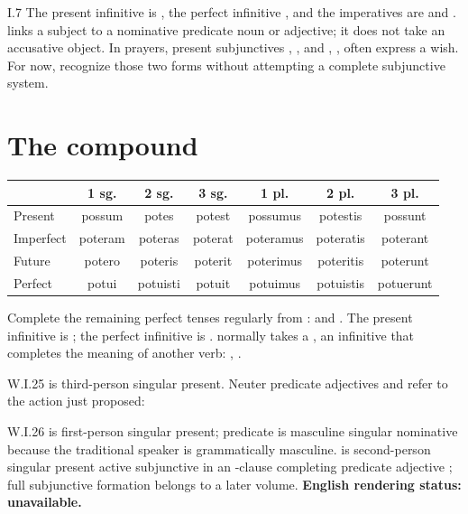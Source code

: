 \begin{courseunit}{I.7}
The present infinitive is , the perfect infinitive
, and the imperatives are  and .
 links a subject to a nominative predicate noun or adjective; it
does not take an accusative object. In prayers, present subjunctives
, , and , ,
often express a wish. For now, recognize those two forms without attempting a
complete subjunctive system.

\section{The compound }

\begin{center}\small
\begin{tabular}{@{}lcccccc@{}}
\toprule
& 1 sg. & 2 sg. & 3 sg. & 1 pl. & 2 pl. & 3 pl. \\
\midrule
Present & possum & potes & potest & possumus & potestis & possunt \\
Imperfect & poteram & poteras & poterat & poteramus & poteratis & poterant \\
Future & potero & poteris & poterit & poterimus & poteritis & poterunt \\
Perfect & potui & potuisti & potuit & potuimus & potuistis & potuerunt \\
\bottomrule
\end{tabular}
\end{center}

Complete the remaining perfect tenses regularly from :
 and
. The present infinitive is ;
the perfect infinitive is .  normally takes a
, an infinitive that completes the meaning of
another verb: , .

\begin{workedexample}{}{W.I.25}
 is third-person singular present. Neuter predicate adjectives
 and  refer to the action just proposed:
\end{workedexample}

\begin{workedexample}{}{W.I.26}
 is first-person singular present; predicate  is
masculine singular nominative because the traditional speaker is grammatically
masculine.  is second-person singular present active subjunctive
in an -clause completing predicate adjective ; full
subjunctive formation belongs to a later volume.
\textbf{English rendering status: unavailable.}
\end{workedexample}


\end{courseunit}
